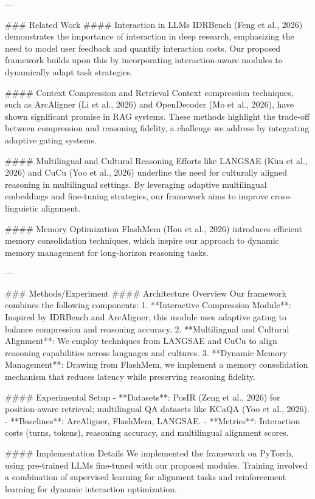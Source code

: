---

### Related Work
#### Interaction in LLMs
IDRBench (Feng et al., 2026) demonstrates the importance of interaction in deep research, emphasizing the need to model user feedback and quantify interaction costs. Our proposed framework builds upon this by incorporating interaction-aware modules to dynamically adapt task strategies.

#### Context Compression and Retrieval
Context compression techniques, such as ArcAligner (Li et al., 2026) and OpenDecoder (Mo et al., 2026), have shown significant promise in RAG systems. These methods highlight the trade-off between compression and reasoning fidelity, a challenge we address by integrating adaptive gating systems.

#### Multilingual and Cultural Reasoning
Efforts like LANGSAE (Kim et al., 2026) and CuCu (Yoo et al., 2026) underline the need for culturally aligned reasoning in multilingual settings. By leveraging adaptive multilingual embeddings and fine-tuning strategies, our framework aims to improve cross-linguistic alignment.

#### Memory Optimization
FlashMem (Hou et al., 2026) introduces efficient memory consolidation techniques, which inspire our approach to dynamic memory management for long-horizon reasoning tasks.

---

### Methods/Experiment
#### Architecture Overview
Our framework combines the following components:
1. **Interactive Compression Module**: Inspired by IDRBench and ArcAligner, this module uses adaptive gating to balance compression and reasoning accuracy.
2. **Multilingual and Cultural Alignment**: We employ techniques from LANGSAE and CuCu to align reasoning capabilities across languages and cultures.
3. **Dynamic Memory Management**: Drawing from FlashMem, we implement a memory consolidation mechanism that reduces latency while preserving reasoning fidelity.

#### Experimental Setup
- **Datasets**: PosIR (Zeng et al., 2026) for position-aware retrieval; multilingual QA datasets like KCaQA (Yoo et al., 2026).
- **Baselines**: ArcAligner, FlashMem, LANGSAE.
- **Metrics**: Interaction costs (turns, tokens), reasoning accuracy, and multilingual alignment scores.

#### Implementation Details
We implemented the framework on PyTorch, using pre-trained LLMs fine-tuned with our proposed modules. Training involved a combination of supervised learning for alignment tasks and reinforcement learning for dynamic interaction optimization.

